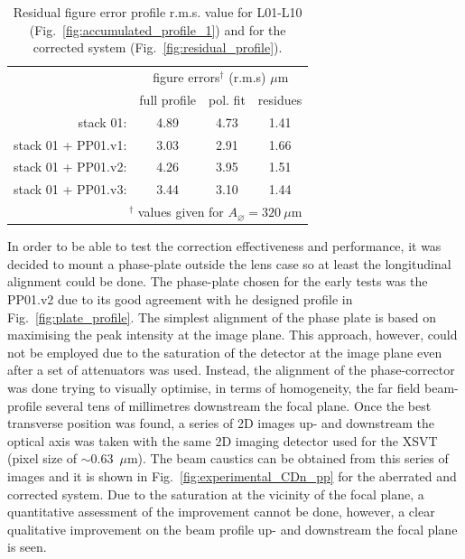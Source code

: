 \begin{refsection}
\begin{table}[t]
    \caption[Residual figure error profile r.m.s. value for L01-L10 and for the corrected system]{Residual figure error profile r.m.s. value for L01-L10 (Fig.~\ref{fig:accumulated_profile_1}) and for the corrected system (Fig.~\ref{fig:residual_profile}).}
    \centering
    \label{tab:corrected_xsvt}\small
    \begin{tabular}{rccc}
    \hline \hline
    &\multicolumn{3}{c}{figure errors$^\dagger$ (r.m.s) $\mu$m}\\ \cline{2-4}
    &full profile & pol. fit   & residues \\ \hline
    stack 01:           &4.89  &4.73  &1.41\\
    stack 01 + PP01.v1: &3.03  &2.91  &1.66\\
    stack 01 + PP01.v2: &4.26  &3.95  &1.51\\
    stack 01 + PP01.v3: &3.44  &3.10  &1.44\\
    \hline \hline
    \multicolumn{4}{r}{\footnotesize{$^\dagger$ values given for $A_{\diameter}=320~\mu\text{m}$}}     
    \end{tabular}
\end{table}

In order to be able to test the correction effectiveness and performance, it was decided to mount a phase-plate outside the lens case so at least the longitudinal alignment could be done. The phase-plate chosen for the early tests was the PP01.v2 due to its good agreement with he designed profile in Fig.~\ref{fig:plate_profile}. The simplest alignment of the phase plate is based on maximising the peak intensity at the image plane. This approach, however, could not be employed due to the saturation of the detector at the image plane even after a set of attenuators was used. Instead, the alignment of the phase-corrector was done trying to visually optimise, in terms of homogeneity, the far field beam-profile several tens of millimetres downstream the focal plane. Once the best transverse position was found, a series of 2D images up- and downstream the optical axis was taken with the same 2D imaging detector used for the XSVT (pixel size of $\sim$0.63~$\mu$m). The beam caustics can be obtained from this series of images and it is shown in Fig.~\ref{fig:experimental_CDn_pp} for the aberrated and corrected system. Due to the saturation at the vicinity of the focal plane, a quantitative assessment of the improvement cannot be done, however, a clear qualitative improvement on the beam profile up- and downstream the focal plane is seen.



\end{refsection}
